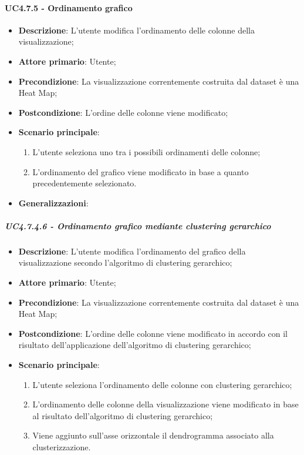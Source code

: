\paragraph{UC4.7.5 - Ordinamento grafico}
\label{par:uc4.7.5}
\begin{itemize}
    \item \textbf{Descrizione}:     L'utente modifica l'ordinamento delle colonne della visualizzazione;
    \item \textbf{Attore primario}: Utente;
    \item \textbf{Precondizione}:   La visualizzazione correntemente costruita dal dataset è una Heat Map;
    \item \textbf{Postcondizione}:  L'ordine delle colonne viene modificato;
    \item \textbf{Scenario principale}:
    \begin{enumerate}
        \item L'utente seleziona uno tra i possibili ordinamenti delle colonne;
        \item L'ordinamento del grafico viene modificato in base a quanto precedentemente selezionato.
    \end{enumerate}
    \item \textbf{Generalizzazioni}:
\end{itemize}

\subparagraph{UC4.7.4.6 - Ordinamento grafico mediante clustering gerarchico}
\label{spar:uc4.7.4.6}
\begin{itemize}
    \item \textbf{Descrizione}:     L'utente modifica l'ordinamento del grafico  della visualizzazione secondo l'algoritmo di clustering gerarchico;
    \item \textbf{Attore primario}: Utente;
    \item \textbf{Precondizione}:   La visualizzazione correntemente costruita dal dataset è una Heat Map;
    \item \textbf{Postcondizione}:  L'ordine delle colonne viene modificato in accordo con il risultato dell'applicazione dell'algoritmo di clustering gerarchico;
    \item \textbf{Scenario principale}:
    \begin{enumerate}
        \item L'utente seleziona l'ordinamento delle colonne con clustering gerarchico;
        \item L'ordinamento delle colonne della visualizzazione viene modificato in base al risultato dell'algoritmo di clustering gerarchico;
        \item Viene aggiunto sull'asse orizzontale il dendrogramma associato alla clusterizzazione.
    \end{enumerate}
\end{itemize}

